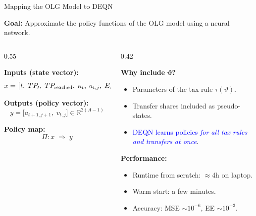 \documentclass[aspectratio=1610]{beamer}
\begin{document}
\begin{frame}[fragile]{Mapping the OLG Model to DEQN}

\noindent\textbf{Goal:} Approximate the policy functions of the OLG model using a neural network.

\vspace{0.4cm}

\begin{columns}
\begin{column}{0.55\textwidth}

\textbf{Inputs (state vector):}
\[
x = \big[t,\; TP_t,\; TP_{\mathrm{reached}},\; \kappa_t,\; a_{t,j},\; E_t,\; 
\textcolor{blue}{\vartheta}\big]
\in \mathbb{R}^{A + 5 + d_\vartheta}
\]

\textbf{Outputs (policy vector):}
\[
y = \big[a_{t+1,j+1},\; v_{t,j}\big]
\in \mathbb{R}^{2(A-1)}
\]

\textbf{Policy map:}
\[
\Pi: x \;\Rightarrow\; y
\]

\end{column}

\begin{column}{0.42\textwidth}

\textbf{Why include $\boldsymbol{\vartheta}$?}
\begin{itemize}
  \item Parameters of the tax rule $\tau(\vartheta)$. 
  \item Transfer shares included as pseudo-states.  
  \item \textcolor{blue}{DEQN learns policies \emph{for all tax rules and transfers at once}}.
\end{itemize}

\vspace{0.3cm}

\textbf{Performance:}
\begin{itemize}
  \item Runtime from scratch: $\approx$4h on laptop. 
  \item Warm start: a few minutes. 
  \item Accuracy: MSE $\sim 10^{-6}$,\newline 
  EE $\sim 10^{-3}$.
\end{itemize}

\end{column}
\end{columns}

\end{frame}
\end{document}

